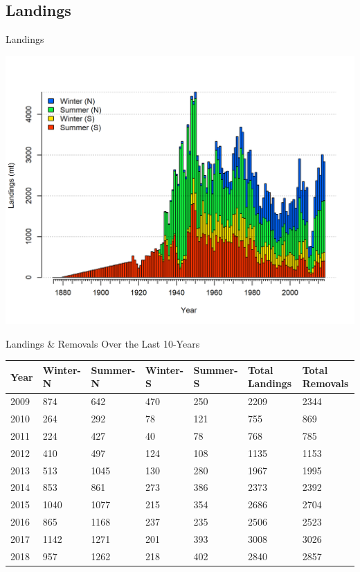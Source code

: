 \documentclass[pdf]{beamer}\usepackage[]{graphicx}\usepackage[]{color}
\begin{document}
\subsection{Landings}
\begin{frame}{Landings}
  \begin{center}
    \includegraphics[scale = 0.40]{r4ss/catch2 landings stacked.png}
  \end{center}
\end{frame}



\begin{frame}{Landings & Removals Over the Last 10-Years}
  \begin{table}[ht]
  \centering
  \begin{tabular}{p{0.5in}p{0.5in}p{0.5in}p{0.5in}p{0.5in}p{0.5in}p{0.5in}}
  Year & Winter-N & Summer-N & Winter-S & Summer-S & Total Landings & Total Removals \\ 
  \hline
  2009 & 874  & 642  & 470 & 250 & 2209 & 2344\\ 
  2010 & 264  & 292  & 78  & 121 & 755  & 869 \\ 
  2011 & 224  & 427  & 40  & 78  & 768  & 785 \\ 
  2012 & 410  & 497  & 124 & 108 & 1135 & 1153\\ 
  2013 & 513  & 1045 & 130 & 280 & 1967 & 1995\\ 
  2014 & 853  & 861  & 273 & 386 & 2373 & 2392\\ 
  2015 & 1040 & 1077 & 215 & 354 & 2686 & 2704\\ 
  2016 & 865  & 1168 & 237 & 235 & 2506 & 2523\\ 
  2017 & 1142 & 1271 & 201 & 393 & 3008 & 3026\\ 
  2018 & 957  & 1262 & 218 & 402 & 2840 & 2857\\ 
  \hline
  \end{tabular}
  \end{table}
\end{frame}
\end{document}
